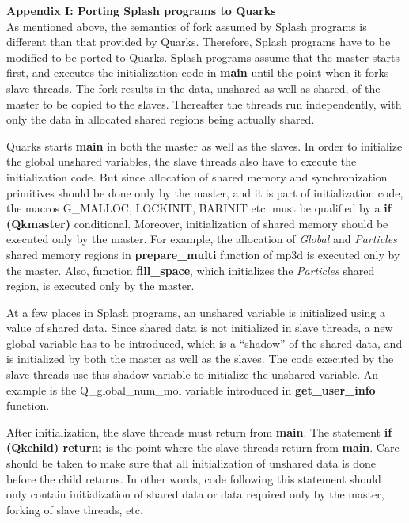 {\Large {\bf Appendix I: Porting Splash programs to Quarks}}\\

\setlength{\parindent}{9 mm}
\vspace*{-7 mm}
As mentioned above, the semantics of fork assumed by Splash programs
is different than that provided by Quarks. Therefore, Splash programs
have to be modified to be ported to Quarks. Splash programs assume
that the master starts first, and executes the initialization code 
in {\bf main}
until the point when it forks slave threads. The fork results in the
data, unshared as well as shared, of the master to be copied to the
slaves. Thereafter the threads run independently, with only the data
in allocated shared regions being actually shared. 

Quarks starts {\bf main} in both the master as well as the slaves. In
order to initialize the global unshared variables, the slave
threads also have to execute the initialization code. But since
allocation of shared memory and synchronization primitives should be
done only by the master, and it is part of initialization code,
the macros G\_MALLOC, LOCKINIT, BARINIT etc.
must be qualified by a {\bf if (Qkmaster)} conditional.
Moreover, initialization of shared memory should be executed only
by the master. For example, the allocation of {\em Global} and {\em
Particles} shared memory regions in {\bf prepare\_multi} function
of mp3d is executed only by the master. Also, function {\bf
fill\_space}, which initializes the {\em Particles} shared region, is 
executed only by the master. 

At a few places in Splash programs, an unshared variable is initialized using
a value of shared data. Since shared data is not initialized in slave
threads, a new global variable has to be introduced, which is a
``shadow'' of the shared data, and is initialized by both the master
as well as the slaves. The code executed by the slave threads use this
shadow variable to initialize the unshared variable. 
An example is the Q\_global\_num\_mol variable
introduced in {\bf get\_user\_info} function. 

After initialization, the slave threads must return from {\bf main}. The
statement {\bf if (Qkchild) return;} is the point where
the slave threads return from {\bf main}. Care should be taken to make sure
that all initialization of unshared data is done before the child
returns. In other words, code following this statement
should only contain initialization of shared data or data required
only by the master, forking of slave threads, etc.

